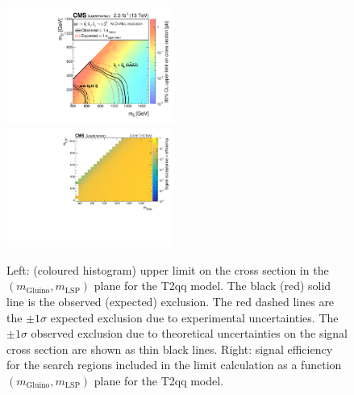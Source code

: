 \clearpage
\begin{figure}[t]
  \begin{center}
    \includegraphics[width=0.49\textwidth]{supplementary/figures/RA1T2qqXSEC} \, 
    \includegraphics[width=0.49\textwidth]{supplementary/figures/T2qq_merging_4_cats} \,     
  \end{center}
  \caption{Left: (coloured histogram) upper limit on the cross section in the $(m_{\mathrm{Gluino}},m_{\mathrm{LSP}})$ plane for the T2qq model. 
  The black (red) solid line is the observed (expected) exclusion. The red dashed lines are the $\pm1\sigma$ expected exclusion due to experimental uncertainties. 
  The $\pm1\sigma$ observed exclusion due to theoretical uncertainties on the signal cross section are shown as thin black lines. 
  Right: signal efficiency for the search regions included in the limit calculation as a function $(m_{\mathrm{Gluino}},m_{\mathrm{LSP}})$ plane for the T2qq model. 
  \label{fig:T2qq_excl}}
\end{figure}




